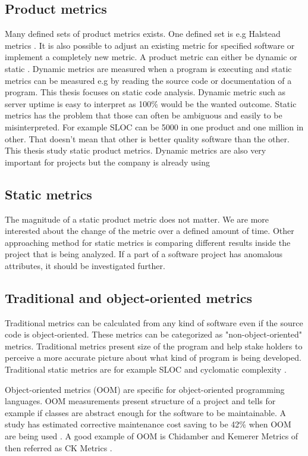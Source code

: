 \subsection{Product metrics}

Many defined sets of product metrics exists. One defined set is e.g Halstead metrics \cite{al2005analysis}. It is also possible to adjust an existing metric for specified software or implement a completely new metric. A product metric can either be dynamic or static \cite{sommerville2011software}. Dynamic metrics are measured when a program is executing and static metrics can be measured e.g by reading the source code or documentation of a program. This thesis focuses on static code analysis. Dynamic metric such as server uptime is easy to interpret as 100\% would be the wanted outcome. Static metrics has the problem that those can often be ambiguous and easily to be misinterpreted. For example SLOC can be 5000 in one product and one million in other. That doesn't mean that other is better quality software than the other. This thesis study static product metrics. Dynamic metrics are also very important for projects but the company is already using 

\subsection{Static metrics}

The magnitude of a static product metric does not matter. We are more interested about the change of the metric over a defined amount of time. Other approaching method for static metrics is comparing different results inside the project that is being analyzed. If a part of a software project has anomalous attributes, it should be investigated further. 

\subsection{Traditional and object-oriented metrics}

Traditional metrics can be calculated from any kind of software even if the source code is object-oriented. These metrics can be categorized as "non-object-oriented" metrics. Traditional metrics present size of the program and help stake holders to perceive a more accurate picture about what kind of program is being developed. Traditional static metrics are for example SLOC and cyclomatic complexity \cite{fenton1997software}.  

Object-oriented metrics (OOM) are specific for object-oriented programming languages. OOM measurements present structure of a project and tells for example if classes are abstract enough for the software to be maintainable. A study has estimated corrective maintenance cost saving to be 42\% when OOM are being used \cite{sarker2005overview}. A good example of OOM is Chidamber and Kemerer Metrics of then referred as CK Metrics \cite{chidamber1994metrics}.

